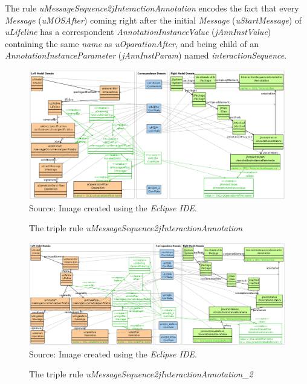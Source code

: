 \documentclass[tuberlin,cic,tc,english,noabntcite, oneside]{iiufrgs}
\begin{document}
The rule \emph{uMessageSequence2jInteractionAnnotation} encodes the fact that every \emph{Message} (\emph{uMOSAfter}) coming right after the initial \emph{Message} (\emph{uStartMessage}) of \emph{uLifeline} has a correspondent \emph{AnnotationInstanceValue} (\emph{jAnnInstValue}) containing the same \emph{name} as \emph{uOparationAfter}, and being child of an \emph{AnnotationInstanceParameter} (\emph{jAnnInstParam}) named \emph{interactionSequence}.

\begin{figure}[H]
	\centering
    \caption{The triple rule \emph{uMessageSequence2jInteractionAnnotation}}
    \includegraphics[width=\textwidth]{uMessageSequence2jInteractionAnnotation} \\
    Source: Image created using the \emph{Eclipse IDE}.
    \label{fig:uMessageSequence2jInteractionAnnotation}
\end{figure}

\begin{figure}[H]
	\centering
    \caption{The triple rule \emph{uMessageSequence2jInteractionAnnotation\_2}}
    \includegraphics[width=\textwidth]{uMessageSequence2jInteractionAnnotation_2} \\
    Source: Image created using the \emph{Eclipse IDE}.
    \label{fig:uMessageSequence2jInteractionAnnotation_2}
\end{figure}
\end{document}
